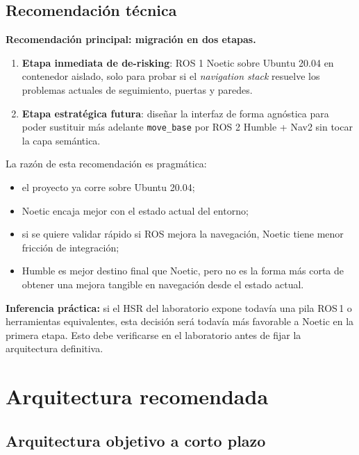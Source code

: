 \documentclass[11pt,a4paper]{article}
\begin{document}
\subsection{Recomendación técnica}

\textbf{Recomendación principal: migración en dos etapas.}

\begin{enumerate}
  \item \textbf{Etapa inmediata de de-risking}: ROS 1 Noetic sobre Ubuntu 20.04
        en contenedor aislado, solo para probar si el \textit{navigation stack}
        resuelve los problemas actuales de seguimiento, puertas y paredes.
  \item \textbf{Etapa estratégica futura}: diseñar la interfaz de forma
        agnóstica para poder sustituir más adelante \texttt{move\_base} por
        ROS 2 Humble + Nav2 sin tocar la capa semántica.
\end{enumerate}

La razón de esta recomendación es pragmática:

\begin{itemize}
  \item el proyecto ya corre sobre Ubuntu 20.04;
  \item Noetic encaja mejor con el estado actual del entorno;
  \item si se quiere validar rápido si ROS mejora la navegación, Noetic tiene
        menor fricción de integración;
  \item Humble es mejor destino final que Noetic, pero no es la forma más corta
        de obtener una mejora tangible en navegación desde el estado actual.
\end{itemize}

\textbf{Inferencia práctica:} si el HSR del laboratorio expone todavía una pila
ROS\,1 o herramientas equivalentes, esta decisión será todavía más favorable a
Noetic en la primera etapa. Esto debe verificarse en el laboratorio antes de
fijar la arquitectura definitiva.

\section{Arquitectura recomendada}

\subsection{Arquitectura objetivo a corto plazo}
\end{document}
